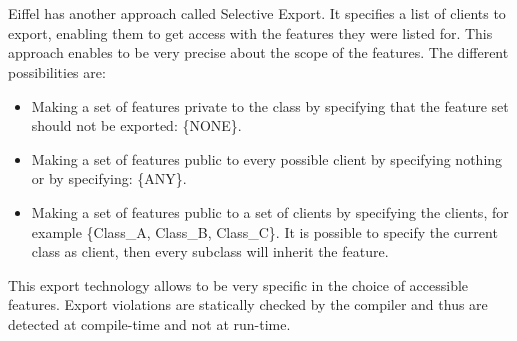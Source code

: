 \documentclass[11pt,a4paper,twocolumn]{article}
\begin{document}
\\
\\
Eiffel has another approach called Selective Export. It specifies a list of clients to export, enabling them to get access with the features they were listed for. This approach enables to be very precise about the scope of the features. The different possibilities are:
\begin{itemize}
\item Making a set of features private to the class by specifying that the feature set should not be exported: \{NONE\}.
\item Making a set of features public to every possible client by specifying nothing or by specifying: \{ANY\}.
\item Making a set of features public to a set of clients by specifying the clients, for example \{Class\_A, Class\_B, Class\_C\}. It is possible to specify the current class as client, then every subclass will inherit the feature.
\end{itemize}
This export technology allows to be very specific in the choice of accessible features. Export violations are statically checked by the compiler and thus are detected at compile-time and not at run-time.
\end{document}
